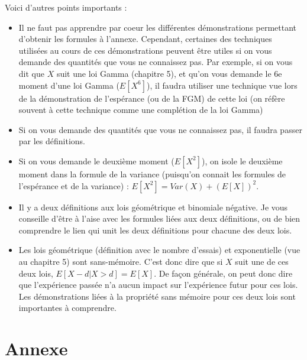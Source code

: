 \documentclass[10pt, french]{article}
\begin{document}
\begin{multicols*}{2}
\begin{definitionNOHFILL}
Voici d'autres points importants :

\begin{itemize}
	\item Il ne faut pas apprendre par coeur les différentes démonstrations permettant d'obtenir les formules à l'annexe. Cependant, certaines des techniques utilisées au cours de ces démonstrations peuvent être utiles si on vous demande des quantités que vous ne connaissez pas. Par exemple, si on vous dit que $X$ suit une loi Gamma (chapitre 5), et qu'on vous demande le 6e moment d'une loi Gamma ($E[X^6]$), il faudra utiliser une technique vue lors de la démonstration de l'espérance (ou de la FGM) de cette loi (on réfère souvent à cette technique comme une complétion de la loi Gamma)
	\item Si on vous demande des quantités que vous ne connaissez pas, il faudra passer par les définitions.
	\item Si on vous demande le deuxième moment ($E[X^2]$), on isole le deuxième moment dans la formule de la variance (puisqu'on connait les formules de l'espérance et de la variance) : $E[X^2] = Var(X) + (E[X])^2$.
	\item Il y a deux définitions aux lois géométrique et binomiale négative. Je vous conseille d'être à l'aise avec les formules liées aux deux définitions, ou de bien comprendre le lien qui unit les deux définitions pour chacune des deux lois.
	\item Les lois géométrique (définition avec le nombre d'essais) et exponentielle (vue au chapitre 5) sont sans-mémoire. C'est donc dire que si $X$ suit une de ces deux lois, $E[X - d|X > d] = E[X]$. De façon générale, on peut donc dire que l'expérience passée n'a aucun impact sur l'expérience futur pour ces lois. Les démonstrations liées à la propriété sans mémoire pour ces deux lois sont importantes à comprendre.
\end{itemize}


\end{definitionNOHFILL}

\end{multicols*}






\appendix
\section*{Annexe}
\renewcommand{\thesubsection}{\Alph{subsection}}
\end{document}
